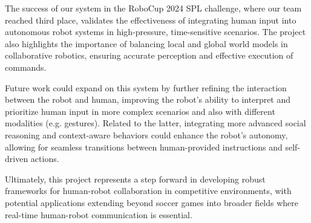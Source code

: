 \documentclass[a4paper, onecolumn, 12pt]{article}
\begin{document}
The success of our system in the RoboCup 2024 SPL challenge, where our team reached third place, validates the effectiveness of integrating human input into autonomous robot systems in high-pressure, time-sensitive scenarios. The project also highlights the importance of balancing local and global world models in collaborative robotics, ensuring accurate perception and effective execution of commands.

Future work could expand on this system by further refining the interaction between the robot and human, improving the robot's ability to interpret and prioritize human input in more complex scenarios and also with different modalities (e.g. gestures). Related to the latter, integrating more advanced social reasoning and context-aware behaviors could enhance the robot's autonomy, allowing for seamless transitions between human-provided instructions and self-driven actions.

Ultimately, this project represents a step forward in developing robust frameworks for human-robot collaboration in competitive environments, with potential applications extending beyond soccer games into broader fields where real-time human-robot communication is essential.




\end{document}
